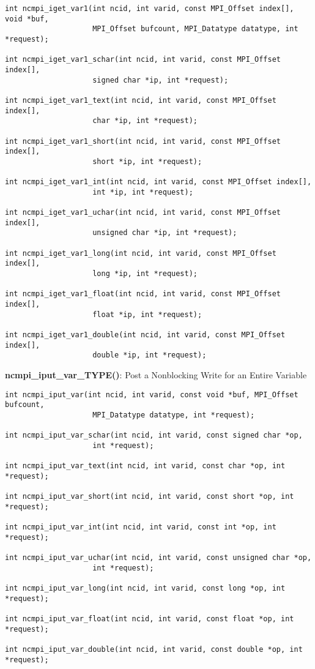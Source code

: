 \begin{verbatim}
int ncmpi_iget_var1(int ncid, int varid, const MPI_Offset index[], void *buf,
                    MPI_Offset bufcount, MPI_Datatype datatype, int *request); 

int ncmpi_iget_var1_schar(int ncid, int varid, const MPI_Offset index[],
                    signed char *ip, int *request); 

int ncmpi_iget_var1_text(int ncid, int varid, const MPI_Offset index[],
                    char *ip, int *request); 

int ncmpi_iget_var1_short(int ncid, int varid, const MPI_Offset index[],
                    short *ip, int *request); 

int ncmpi_iget_var1_int(int ncid, int varid, const MPI_Offset index[],
                    int *ip, int *request); 

int ncmpi_iget_var1_uchar(int ncid, int varid, const MPI_Offset index[],
                    unsigned char *ip, int *request);

int ncmpi_iget_var1_long(int ncid, int varid, const MPI_Offset index[],
                    long *ip, int *request);

int ncmpi_iget_var1_float(int ncid, int varid, const MPI_Offset index[],
                    float *ip, int *request); 

int ncmpi_iget_var1_double(int ncid, int varid, const MPI_Offset index[],
                    double *ip, int *request);
\end{verbatim}


{\bf ncmpi\_iput\_var\_TYPE()}: Post a Nonblocking Write for an Entire Variable

\begin{verbatim}
int ncmpi_iput_var(int ncid, int varid, const void *buf, MPI_Offset bufcount,
                    MPI_Datatype datatype, int *request);

int ncmpi_iput_var_schar(int ncid, int varid, const signed char *op,
                    int *request);

int ncmpi_iput_var_text(int ncid, int varid, const char *op, int *request);

int ncmpi_iput_var_short(int ncid, int varid, const short *op, int *request);

int ncmpi_iput_var_int(int ncid, int varid, const int *op, int *request);

int ncmpi_iput_var_uchar(int ncid, int varid, const unsigned char *op,
                    int *request);

int ncmpi_iput_var_long(int ncid, int varid, const long *op, int *request);

int ncmpi_iput_var_float(int ncid, int varid, const float *op, int *request);

int ncmpi_iput_var_double(int ncid, int varid, const double *op, int *request);
\end{verbatim}



